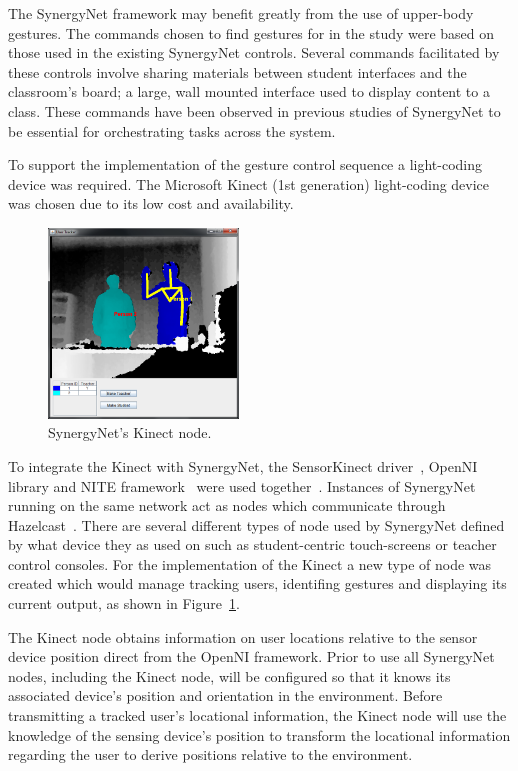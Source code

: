 \documentclass[link]{IWCOMP}
\begin{document}
The SynergyNet framework may benefit greatly from the use of upper-body gestures. 
The commands chosen to find gestures for in the study were based on those used in the existing SynergyNet controls. 
Several commands facilitated by these controls involve sharing materials between student interfaces and the classroom's board; a large, wall mounted interface used to display content to a class.
These commands have been observed in previous studies of SynergyNet to be essential for orchestrating tasks across the system.

To support the implementation of the gesture control sequence a light-coding device was required.
The Microsoft Kinect (1st generation) light-coding device was chosen due to its low cost and availability.

\begin{figure}[h]
   \centering
   \includegraphics[width=0.45\textwidth]{figures/kinect_node.png}
   \caption{SynergyNet's Kinect node.}
   \label{fig:kinectNode}
\end{figure}

To integrate the Kinect with SynergyNet, the SensorKinect driver~\citep{Avin2011}, OpenNI library and NITE framework~\citep{OpenNi2021} were used together~\citep{Davison2012}.
Instances of SynergyNet running on the same network act as nodes which communicate through Hazelcast~\citep{Hazelcast2009}.
There are several different types of node used by SynergyNet defined by what device they as used on such as student-centric touch-screens or teacher control consoles.
For the implementation of the Kinect a new type of node was created which would manage tracking users, identifing gestures and displaying its current output, as shown in Figure~\ref{fig:kinectNode}.

The Kinect node obtains information on user locations relative to the sensor device position direct from the OpenNI framework.
Prior to use all SynergyNet nodes, including the Kinect node, will be configured so that it knows its associated device's position and orientation in the environment.
Before transmitting a tracked user's locational information, the Kinect node will use the knowledge of the sensing device's position to transform the locational information regarding the user to derive positions relative to the environment.
\end{document}
